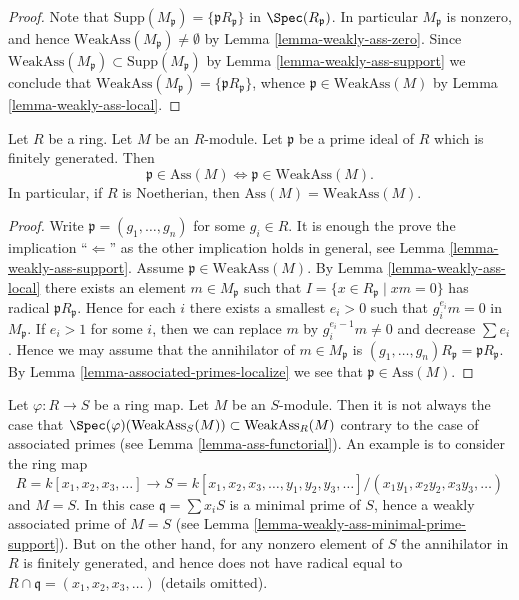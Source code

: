 \begin{proof}
Note that $\text{Supp}(M_{\mathfrak p}) = \{\mathfrak pR_{\mathfrak p}\}$
in $\Spec(R_{\mathfrak p})$. In particular $M_{\mathfrak p}$
is nonzero, and hence $\text{WeakAss}(M_{\mathfrak p}) \not = \emptyset$ by
Lemma \ref{lemma-weakly-ass-zero}.
Since $\text{WeakAss}(M_{\mathfrak p}) \subset \text{Supp}(M_{\mathfrak p})$
by
Lemma \ref{lemma-weakly-ass-support}
we conclude that
$\text{WeakAss}(M_{\mathfrak p}) = \{\mathfrak pR_{\mathfrak p}\}$,
whence $\mathfrak p \in \text{WeakAss}(M)$ by
Lemma \ref{lemma-weakly-ass-local}.
\end{proof}

\begin{lemma}
\label{lemma-ass-weakly-ass}
Let $R$ be a ring. Let $M$ be an $R$-module.
Let $\mathfrak p$ be a prime ideal of $R$ which is finitely generated.
Then
$$
\mathfrak p \in \text{Ass}(M) \Leftrightarrow
\mathfrak p \in \text{WeakAss}(M).
$$
In particular, if $R$ is Noetherian, then $\text{Ass}(M) = \text{WeakAss}(M)$.
\end{lemma}

\begin{proof}
Write $\mathfrak p = (g_1, \ldots, g_n)$ for some $g_i \in R$.
It is enough the prove the implication ``$\Leftarrow$'' as the other
implication holds in general, see
Lemma \ref{lemma-weakly-ass-support}.
Assume $\mathfrak p \in \text{WeakAss}(M)$.
By
Lemma \ref{lemma-weakly-ass-local}
there exists an element $m \in M_{\mathfrak p}$ such that
$I = \{x \in R_{\mathfrak p} \mid xm = 0\}$ has radical
$\mathfrak pR_{\mathfrak p}$. Hence for each $i$ there exists
a smallest $e_i > 0$ such that $g_i^{e_i}m = 0$ in $M_{\mathfrak p}$.
If $e_i > 1$ for some $i$, then we can replace $m$ by
$g_i^{e_i - 1} m \not = 0$ and decrease $\sum e_i$.
Hence we may assume that the annihilator of $m \in M_{\mathfrak p}$ is
$(g_1, \ldots, g_n)R_{\mathfrak p} = \mathfrak p R_{\mathfrak p}$. By
Lemma \ref{lemma-associated-primes-localize}
we see that $\mathfrak p \in \text{Ass}(M)$.
\end{proof}

\begin{remark}
\label{remark-weakly-ass-not-functorial}
Let $\varphi : R \to S$ be a ring map. Let $M$ be an $S$-module.
Then it is not always the case that
$\Spec(\varphi)(\text{WeakAss}_S(M)) \subset \text{WeakAss}_R(M)$
contrary to the case of associated primes (see
Lemma \ref{lemma-ass-functorial}).
An example is to consider the ring map
$$
R = k[x_1, x_2, x_3, \ldots] \to
S = k[x_1, x_2, x_3, \ldots, y_1, y_2, y_3, \ldots]/
(x_1y_1, x_2y_2, x_3y_3, \ldots)
$$
and $M = S$. In this case $\mathfrak q = \sum x_iS$ is a minimal prime of
$S$, hence a weakly associated prime of $M = S$ (see
Lemma \ref{lemma-weakly-ass-minimal-prime-support}).
But on the other hand, for any nonzero element of $S$ the annihilator
in $R$ is finitely generated, and hence does not
have radical equal to $R \cap \mathfrak q = (x_1, x_2, x_3, \ldots)$
(details omitted).
\end{remark}

